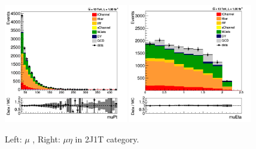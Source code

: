 \begin{figure}[!Hhtb]
  \begin{center}
    \includegraphics[width=0.48\textwidth]{figures/2J1T/muon_pt.png}
    \includegraphics[width=0.48\textwidth]{figures/2J1T/muon_eta.png}
    \caption{\label{fig:2J1Tmu}{Left: $\mu$ \PT, Right: $\mu \eta$ in 2J1T category.}}
  \end{center}
\end{figure}


